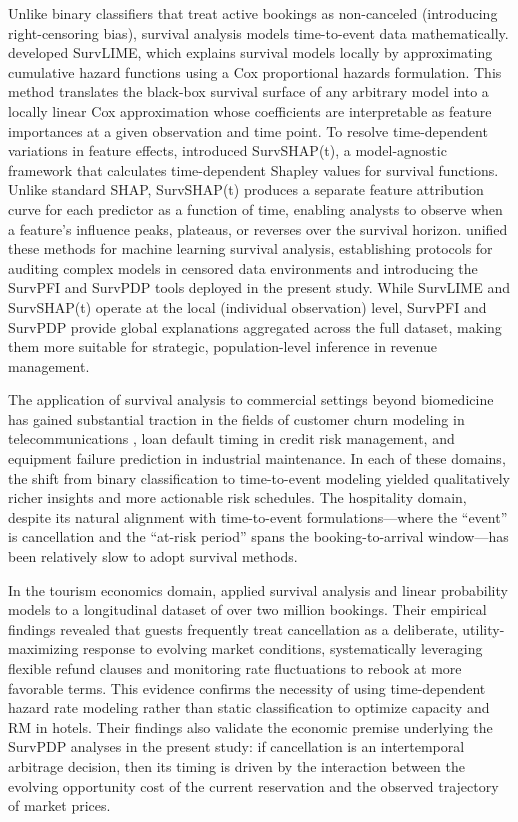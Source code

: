 \documentclass[pdflatex,iicol,sn-mathphys-ay]{sn-jnl}
\theoremstyle{thmstyleone}%
\theoremstyle{thmstyletwo}%
\theoremstyle{thmstylethree}%
\begin{document}
Unlike binary classifiers that treat active bookings as non-canceled (introducing right-censoring bias), survival analysis models time-to-event data mathematically. \cite{kovalev2020survlime} developed SurvLIME, which explains survival models locally by approximating cumulative hazard functions using a Cox proportional hazards formulation. This method translates the black-box survival surface of any arbitrary model into a locally linear Cox approximation whose coefficients are interpretable as feature importances at a given observation and time point. To resolve time-dependent variations in feature effects, \cite{krzyzinski2023survshapt} introduced SurvSHAP(t), a model-agnostic framework that calculates time-dependent Shapley values for survival functions. Unlike standard SHAP, SurvSHAP(t) produces a separate feature attribution curve for each predictor as a function of time, enabling analysts to observe when a feature's influence peaks, plateaus, or reverses over the survival horizon. \cite{langbein2025interpretable} unified these methods for machine learning survival analysis, establishing protocols for auditing complex models in censored data environments and introducing the SurvPFI and SurvPDP tools deployed in the present study. While SurvLIME and SurvSHAP(t) operate at the local (individual observation) level, SurvPFI and SurvPDP provide global explanations aggregated across the full dataset, making them more suitable for strategic, population-level inference in revenue management.

The application of survival analysis to commercial settings beyond biomedicine has gained substantial traction in the fields of customer churn modeling in telecommunications \citep{kleinbaum2012survival}, loan default timing in credit risk management, and equipment failure prediction in industrial maintenance. In each of these domains, the shift from binary classification to time-to-event modeling yielded qualitatively richer insights and more actionable risk schedules. The hospitality domain, despite its natural alignment with time-to-event formulations—where the ``event'' is cancellation and the ``at-risk period'' spans the booking-to-arrival window—has been relatively slow to adopt survival methods.

In the tourism economics domain, \cite{mir2026decoding} applied survival analysis and linear probability models to a longitudinal dataset of over two million bookings. Their empirical findings revealed that guests frequently treat cancellation as a deliberate, utility-maximizing response to evolving market conditions, systematically leveraging flexible refund clauses and monitoring rate fluctuations to rebook at more favorable terms. This evidence confirms the necessity of using time-dependent hazard rate modeling rather than static classification to optimize capacity and RM in hotels. Their findings also validate the economic premise underlying the SurvPDP analyses in the present study: if cancellation is an intertemporal arbitrage decision, then its timing is driven by the interaction between the evolving opportunity cost of the current reservation and the observed trajectory of market prices.
\end{document}
